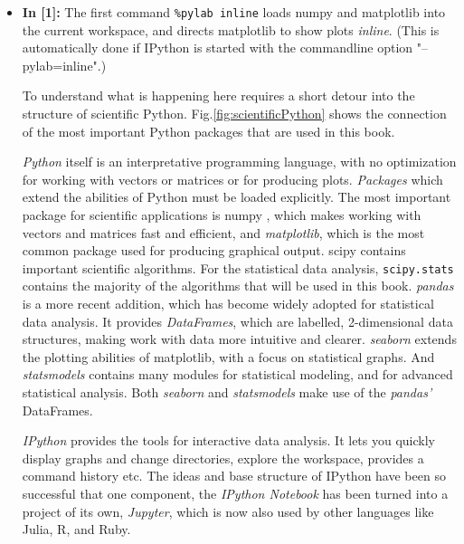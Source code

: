 \begin{itemize}
  \item \textbf{In [1]:} The first command \lstinline{%pylab inline} loads numpy and matplotlib into the current workspace, and directs matplotlib to show plots \emph{inline}. (This is automatically done if IPython is started with the commandline option "--pylab=inline".)

    To understand what is happening here requires a short detour into the structure of scientific Python. Fig.\ref{fig:scientificPython} shows the connection of the most important Python packages that are used in this book.

    \emph{Python} itself is an interpretative programming language, with no optimization for working with vectors or matrices or for producing plots. \emph{Packages} which extend the abilities of Python must be loaded explicitly. The most important package for scientific applications is \gls{numpy} , which makes working with vectors and matrices fast and efficient, and \emph{matplotlib}, which is the most common package used for producing graphical output. \Gls{scipy} contains important scientific algorithms. For the statistical data analysis, \lstinline{scipy.stats} contains the majority of the algorithms that will be used in this book. \emph{pandas} is a more recent addition, which has become widely adopted for statistical data analysis. It provides \emph{DataFrames}, which are labelled, 2-dimensional data structures, making work with data more intuitive and clearer. \emph{seaborn} extends the plotting abilities of \gls{matplotlib}, with a focus on statistical graphs. And \emph{statsmodels} contains many modules for statistical modeling, and for advanced statistical analysis. Both \emph{seaborn} and \emph{statsmodels} make use of the \emph{pandas'} DataFrames.

    \emph{IPython} provides the tools for interactive data analysis. It lets you quickly display graphs and change directories, explore the workspace, provides a command history etc. The ideas and base structure of IPython have been so successful that one component, the \emph{IPython Notebook} has been turned into a project of its own, \emph{Jupyter}, which is now also used by other languages like Julia, R, and Ruby.


\end{itemize}
